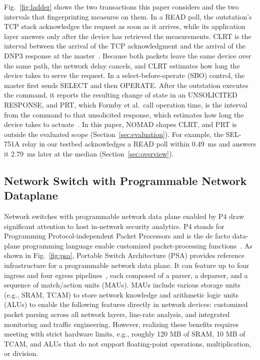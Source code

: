 \documentclass[conference]{IEEEtran}
\begin{document}
Fig.~\ref{fig:ladder} shows the two transactions this paper considers and the two intervals that fingerprinting measures on them. In a READ poll, the outstation's TCP stack acknowledges the request as soon as it arrives, while its application layer answers only after the device has retrieved the measurements. CLRT is the interval between the arrival of the TCP acknowledgment and the arrival of the DNP3 response at the master~\cite{formby2016}. Because both packets leave the same device over the same path, the network delay cancels, and CLRT estimates how long the device takes to serve the request. In a select-before-operate (SBO) control, the master first sends SELECT and then OPERATE. After the outstation executes the command, it reports the resulting change of state in an UNSOLICITED RESPONSE, and PRT, which Formby et al.\ call operation time, is the interval from the command to that unsolicited response, which estimates how long the device takes to actuate~\cite{formby2016}. In this paper, NOMAD shapes CLRT, and PRT is outside the evaluated scope (Section~\ref{sec:evaluation}). For example, the SEL-751A relay in our testbed acknowledges a READ poll within 0.49~ms and answers it 2.79~ms later at the median (Section~\ref{sec:overview}).

\subsection{Network Switch with Programmable Network Dataplane}
Network switches with programmable network data plane enabled by P4 draw significant attention to host in-network security analytics. P4 stands for Programming Protocol-independent Packet Processors and is the de facto data-plane programming language enable customized packet-processing functions~\cite{p4ccr2014}. 
As shown in Fig.~\ref{fig:psa}, Portable Switch Architecture (PSA) provides reference infrastructure for a programmable network data plane. It can feature up to four ingress and four egress pipelines~\cite{p42022psa}, each composed of a parser, a deparser, and a sequence of match/action units (MAUs). MAUs include various storage units (e.g., SRAM, TCAM) to store network knowledge and arithmetic logic units (ALUs) to enable the following features directly in network devices: customized packet parsing across all network layers, line-rate analysis, and integrated monitoring and traffic engineering. However, realizing these benefits requires meeting with strict hardware limits, e.g., roughly 120 MB of SRAM, 10 MB of TCAM, and ALUs that do not support floating-point operations, multiplication, or division. 
\end{document}
